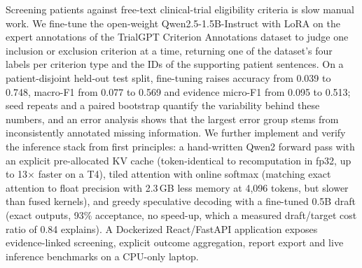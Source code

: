 Screening patients against free-text clinical-trial eligibility criteria is slow manual work.
We fine-tune the open-weight Qwen2.5-1.5B-Instruct with LoRA on the expert annotations of the
TrialGPT Criterion Annotations dataset to judge one inclusion or exclusion criterion at a time,
returning one of the dataset's four labels per criterion type and the IDs of the supporting patient
sentences. On a patient-disjoint held-out test split, fine-tuning raises accuracy from 0.039 to
0.748, macro-F1 from 0.077 to 0.569 and evidence micro-F1 from 0.095 to 0.513; seed repeats and a
paired bootstrap quantify the variability behind these numbers, and an error analysis shows that
the largest error group stems from inconsistently annotated missing information. We further
implement and verify the inference stack from first principles: a hand-written Qwen2 forward pass
with an explicit pre-allocated KV cache (token-identical to recomputation in fp32, up to
13$\times$ faster on a T4), tiled attention with online softmax (matching exact attention to float
precision with 2.3\,GB less memory at 4,096 tokens, but slower than fused kernels), and greedy
speculative decoding with a fine-tuned 0.5B draft (exact outputs, 93\% acceptance, no speed-up,
which a measured draft/target cost ratio of 0.84 explains). A Dockerized React/FastAPI application
exposes evidence-linked screening, explicit outcome aggregation, report export and live inference
benchmarks on a CPU-only laptop.
